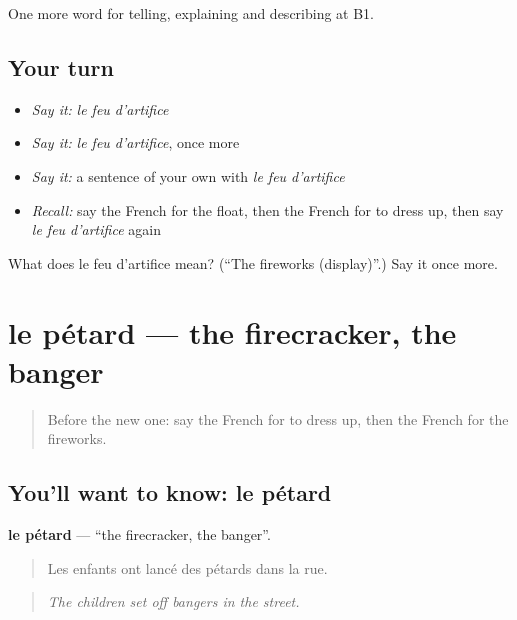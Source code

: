 \begin{grammarlens}[title={What you've built}]
One more word for telling, explaining and describing at B1.
\end{grammarlens}

\subsection*{Your turn}
\begin{itemize}
\raggedright
  \item \emph{Say it:} \emph{le feu d'artifice}
  \item \emph{Say it:} \emph{le feu d'artifice}, once more
  \item \emph{Say it:} a sentence of your own with \emph{le feu d'artifice}
  \item \emph{Recall:} say the French for the float, then the French for to dress up, then say \emph{le feu d'artifice} again
\end{itemize}

\begin{tcolorbox}[breakable,colback=teal!4,colframe=teal!35!black,title={Before you move on}]
What does le feu d'artifice mean? (\textquotedblleft{}The fireworks (display)\textquotedblright{}.) Say it once more.
\end{tcolorbox}
\section[le pétard]{le pétard — the firecracker, the banger}

\label{lesson:FR-C318-petard}



\begin{quote}
Before the new one: say the French for to dress up, then the French for the fireworks.
\end{quote}

\subsection*{You'll want to know: le pétard}
\textbf{le pétard} — \textquotedblleft{}the firecracker, the banger\textquotedblright{}.

\begin{quote}
Les enfants ont lancé des pétards dans la rue.
\end{quote}

\begin{quote}
\emph{The children set off bangers in the street.}
\end{quote}

